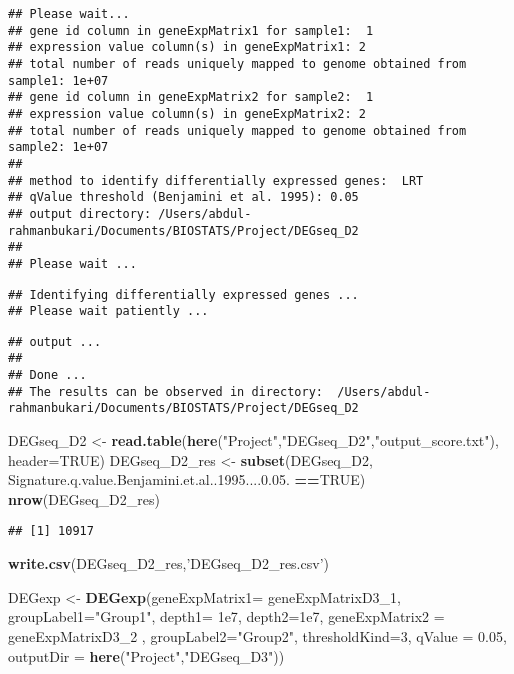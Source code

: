 \documentclass[]{article}
\newenvironment{Shaded}{\begin{snugshade}}{\end{snugshade}}
\newcommand{\DataTypeTok}[1]{\textcolor[rgb]{0.13,0.29,0.53}{#1}}
\newcommand{\DecValTok}[1]{\textcolor[rgb]{0.00,0.00,0.81}{#1}}
\newcommand{\FloatTok}[1]{\textcolor[rgb]{0.00,0.00,0.81}{#1}}
\newcommand{\KeywordTok}[1]{\textcolor[rgb]{0.13,0.29,0.53}{\textbf{#1}}}
\newcommand{\NormalTok}[1]{#1}
\newcommand{\OperatorTok}[1]{\textcolor[rgb]{0.81,0.36,0.00}{\textbf{#1}}}
\newcommand{\OtherTok}[1]{\textcolor[rgb]{0.56,0.35,0.01}{#1}}
\newcommand{\StringTok}[1]{\textcolor[rgb]{0.31,0.60,0.02}{#1}}
\begin{document}
\begin{verbatim}
## Please wait...
## gene id column in geneExpMatrix1 for sample1:  1 
## expression value column(s) in geneExpMatrix1: 2 
## total number of reads uniquely mapped to genome obtained from sample1: 1e+07 
## gene id column in geneExpMatrix2 for sample2:  1 
## expression value column(s) in geneExpMatrix2: 2 
## total number of reads uniquely mapped to genome obtained from sample2: 1e+07 
## 
## method to identify differentially expressed genes:  LRT 
## qValue threshold (Benjamini et al. 1995): 0.05 
## output directory: /Users/abdul-rahmanbukari/Documents/BIOSTATS/Project/DEGseq_D2 
## 
## Please wait ...
\end{verbatim}

\begin{verbatim}
## Identifying differentially expressed genes ...
## Please wait patiently ...
\end{verbatim}

\begin{verbatim}
## output ...
## 
## Done ...
## The results can be observed in directory:  /Users/abdul-rahmanbukari/Documents/BIOSTATS/Project/DEGseq_D2
\end{verbatim}

\begin{Shaded}
\begin{Highlighting}[]
\NormalTok{DEGseq_D2 <-}\StringTok{ }\KeywordTok{read.table}\NormalTok{(}\KeywordTok{here}\NormalTok{(}\StringTok{"Project"}\NormalTok{,}\StringTok{"DEGseq_D2"}\NormalTok{,}\StringTok{"output_score.txt"}\NormalTok{), }\DataTypeTok{header=}\OtherTok{TRUE}\NormalTok{)}
\NormalTok{DEGseq_D2_res <-}\StringTok{ }\KeywordTok{subset}\NormalTok{(DEGseq_D2, Signature.q.value.Benjamini.et.al..}\DecValTok{1995}\NormalTok{....}\DecValTok{0}\NormalTok{.}\FloatTok{05.} \OperatorTok{==}\OtherTok{TRUE}\NormalTok{)}
\KeywordTok{nrow}\NormalTok{(DEGseq_D2_res)}
\end{Highlighting}
\end{Shaded}

\begin{verbatim}
## [1] 10917
\end{verbatim}

\begin{Shaded}
\begin{Highlighting}[]
\KeywordTok{write.csv}\NormalTok{(DEGseq_D2_res,}\StringTok{'DEGseq_D2_res.csv'}\NormalTok{)}

\NormalTok{DEGexp <-}\StringTok{ }\KeywordTok{DEGexp}\NormalTok{(}\DataTypeTok{geneExpMatrix1=}\NormalTok{ geneExpMatrixD3_}\DecValTok{1}\NormalTok{, }\DataTypeTok{groupLabel1=}\StringTok{"Group1"}\NormalTok{, }\DataTypeTok{depth1=} \FloatTok{1e7}\NormalTok{, }\DataTypeTok{depth2=}\FloatTok{1e7}\NormalTok{, }\DataTypeTok{geneExpMatrix2 =}\NormalTok{ geneExpMatrixD3_}\DecValTok{2}\NormalTok{ , }\DataTypeTok{groupLabel2=}\StringTok{"Group2"}\NormalTok{, }\DataTypeTok{thresholdKind=}\DecValTok{3}\NormalTok{, }\DataTypeTok{qValue =} \FloatTok{0.05}\NormalTok{, }\DataTypeTok{outputDir =} \KeywordTok{here}\NormalTok{(}\StringTok{"Project"}\NormalTok{,}\StringTok{"DEGseq_D3"}\NormalTok{))}
\end{Highlighting}
\end{Shaded}
\end{document}
